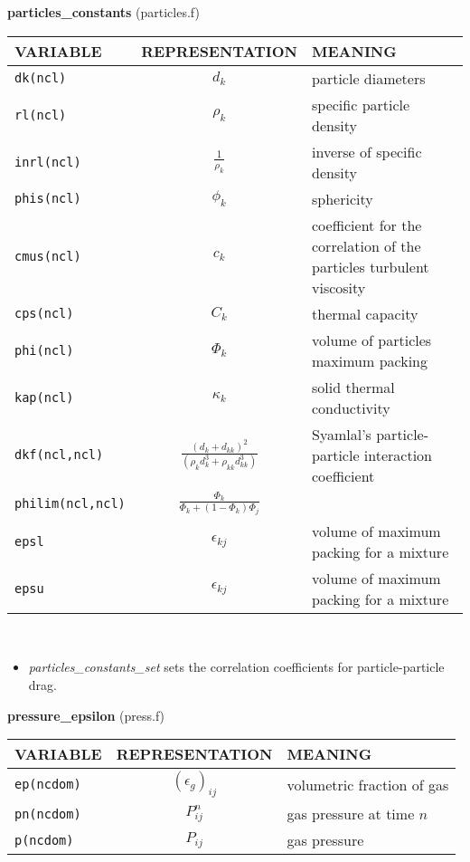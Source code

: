 %
{\large{\bf particles\_constants}} (particles.f)\\[5mm]
\begin{tabular}{|p{6cm}|c|p{6cm}|}\hline
VARIABLE & REPRESENTATION & MEANING\\\hline
\tt dk(ncl) & $d_k$ &  particle diameters\\\hline
\tt rl(ncl) & $\rho_k$ & specific particle density\\\hline
\tt inrl(ncl)& $\frac{1}{\rho_k} $& inverse of specific density\\\hline
\tt phis(ncl)& $\phi_k$   & sphericity\\\hline
\tt cmus(ncl) & $c_k$ & coefficient for the correlation of the particles turbulent viscosity\\\hline
\tt cps(ncl) & $C_k$ &   thermal capacity\\\hline
\tt phi(ncl) & $\Phi_k$ & volume of particles maximum packing\\\hline
\tt kap(ncl) & $\kappa_k$ &  solid thermal conductivity\\\hline
\tt dkf(ncl,ncl) & $\frac{(d_k+d_{kk})^2}{(\rho_kd_k^3+\rho_{kk}d_{kk}^3)}$ &   Syamlal's particle-particle interaction coefficient \\\hline
\tt philim(ncl,ncl) &$ \frac{\Phi_k}{\Phi_k+(1-\Phi_k)\Phi_j}$& \\\hline
\tt epsl & $\epsilon_{kj}$ & volume of maximum packing for a mixture\\\hline
\tt epsu & $\epsilon_{kj}$ & volume of maximum packing for a mixture\\\hline
\end{tabular}\\
\begin{itemize}
\item{\em particles\_constants\_set} sets the correlation coefficients for particle-particle drag.
\end{itemize}
%
%
{\large{\bf pressure\_epsilon}} (press.f)\\[5mm]
\begin{tabular}{|p{6cm}|c|p{6cm}|}\hline
VARIABLE & REPRESENTATION & MEANING\\\hline
\tt ep(ncdom) & $(\epsilon_g)_{ij}$ &  volumetric fraction of gas\\\hline
\tt pn(ncdom) & $P_{ij}^{n}$ &  gas pressure at time $n$\\\hline
\tt p(ncdom) & $P_{ij}$ &  gas pressure\\\hline
\end{tabular}\\[5mm]

